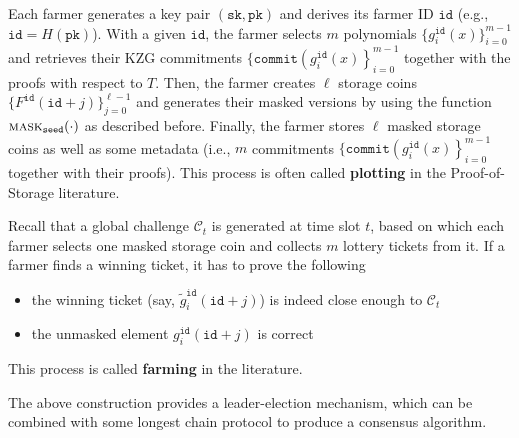 \documentclass[12pt, onecolumn]{IEEEtran}
\newcommand{\sk}{\texttt{sk}}
\newcommand{\pk}{\texttt{pk}}
\newcommand{\id}{\texttt{id}}
\newcommand{\seed}{\texttt{seed}}
\newcommand{\cmt}{\texttt{commit}}
\newcommand{\mask}{\textsc{mask}}
\begin{document}
Each farmer generates a key pair $(\sk, \pk)$ and derives its farmer ID $\id$ (e.g., $\id = H(\pk)$).
With a given $\id$, the farmer selects $m$ polynomials $\{g_i^{\id}(x) \}_{i = 0}^{m - 1}$ and retrieves their KZG commitments $\{\cmt\left(g_i^{\id}(x) \right \}_{i = 0}^{m - 1}$
together with the proofs with respect to $T$. Then, the farmer creates $\ell$ storage coins 
$\{ F^{\id}(\id + j) \}_{j = 0}^{\ell - 1}$ and generates their masked versions by using the function $\mask_{\seed}(\cdot)$ as described before.
Finally, the farmer stores $\ell$ masked storage coins as well as some metadata (i.e., $m$ commitments $\{\cmt\left(g_i^{\id}(x) \right \}_{i = 0}^{m - 1}$ together with their proofs).
This process is often called {\bf plotting} in the Proof-of-Storage literature.

Recall that a global challenge $\mathcal{C}_t$ is generated at time slot $t$, based on which each farmer selects one masked storage coin and collects $m$ lottery tickets from it. If a farmer finds a winning ticket, it has to prove the following
\begin{itemize}
    \item the winning ticket (say, $\tilde{g}_i^{\id}(\id + j)$) is indeed close enough to $\mathcal{C}_t$
    \item the unmasked element ${g}_i^{\id}(\id + j)$ is correct
\end{itemize}
This process is called {\bf farming} in the literature. 

The above construction provides a leader-election mechanism, which can be combined with some longest chain protocol to produce a consensus algorithm.

\end{document}
